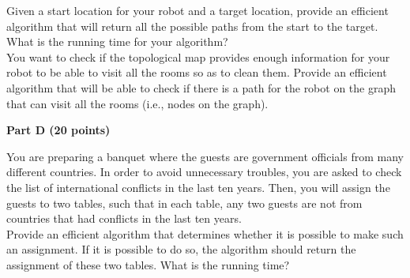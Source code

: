 \documentclass{article}
\begin{document}
 Given a start location for your robot and a target
location, provide an efficient algorithm that will return all the
possible paths from the start to the target.  What is the running time
for your algorithm?\\

 You want to check if the topological map provides
enough information for your robot to be able to visit all the rooms so
as to clean them. Provide an efficient algorithm that will be able to
check if there is a path for the robot on the graph that can visit all
the rooms (i.e., nodes on the graph).\\

\begin{center}
{\bf Part D (20 points)}
\end{center}

 You are preparing a banquet where the
guests are government officials from many different countries. In
order to avoid unnecessary troubles, you are asked to check the list
of international conflicts in the last ten years. Then, you will
assign the guests to two tables, such that in each table, any two
guests are not from countries that had conflicts in the last ten
years.\\

\noindent Provide an efficient algorithm that determines whether it is
possible to make such an assignment. If it is possible to do so, the
algorithm should return the assignment of these two tables. What is
the running time?\\
\end{document}
